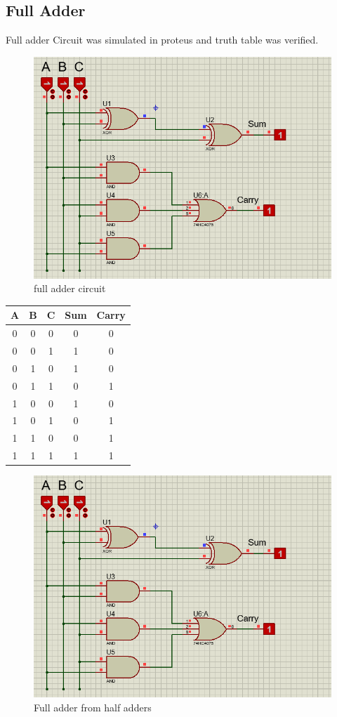 \documentclass[a4paper, 12pt]{article}
\begin{document}
\subsection{Full Adder}
Full adder Circuit was simulated in proteus and truth table was verified.
\begin{figure}[h]
	\centering
	\includegraphics[scale=0.6]{full-adder.png}
	\caption{full adder circuit}
\end{figure}
	\begin{center}
	\begin{tabular}[h]{|c|c|c|c|c|}
	\hline
	A & B & C & Sum & Carry \\
	\hline
	0 & 0 & 0 & 0 & 0 \\
	0 & 0 & 1 & 1 & 0 \\
	0 & 1 & 0 & 1 & 0 \\
	0 & 1 & 1 & 0 & 1 \\
	1 & 0 & 0 & 1 & 0 \\
	1 & 0 & 1 & 0 & 1 \\
	1 & 1 & 0 & 0 & 1 \\
	1 & 1 & 1 & 1 & 1 \\
	\hline
	\end{tabular}
	\end{center}
\begin{figure}[h]
	\centering
	\includegraphics[scale=0.6]{full-adder.png}
	\caption{Full adder from half adders}
\end{figure}
\end{document}
